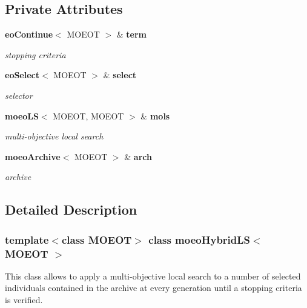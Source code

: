 \subsection*{Private Attributes}
\begin{CompactItemize}
\item 
{\bf eo\-Continue}$<$ MOEOT $>$ \& {\bf term}\label{classmoeoHybridLS_776a00e2e8970ad6e3940c61eabd52ba}

\begin{CompactList}\small\item\em stopping criteria \item\end{CompactList}\item 
{\bf eo\-Select}$<$ MOEOT $>$ \& {\bf select}\label{classmoeoHybridLS_106ca80830d807da0cfdcac934737533}

\begin{CompactList}\small\item\em selector \item\end{CompactList}\item 
{\bf moeo\-LS}$<$ MOEOT, MOEOT $>$ \& {\bf mols}\label{classmoeoHybridLS_28af163ec90dbff609b38666b249a19c}

\begin{CompactList}\small\item\em multi-objective local search \item\end{CompactList}\item 
{\bf moeo\-Archive}$<$ MOEOT $>$ \& {\bf arch}\label{classmoeoHybridLS_4cda70ac38a51d7b629a1fed56af4c33}

\begin{CompactList}\small\item\em archive \item\end{CompactList}\end{CompactItemize}


\subsection{Detailed Description}
\subsubsection*{template$<$class MOEOT$>$ class moeo\-Hybrid\-LS$<$ MOEOT $>$}

This class allows to apply a multi-objective local search to a number of selected individuals contained in the archive at every generation until a stopping criteria is verified. 



